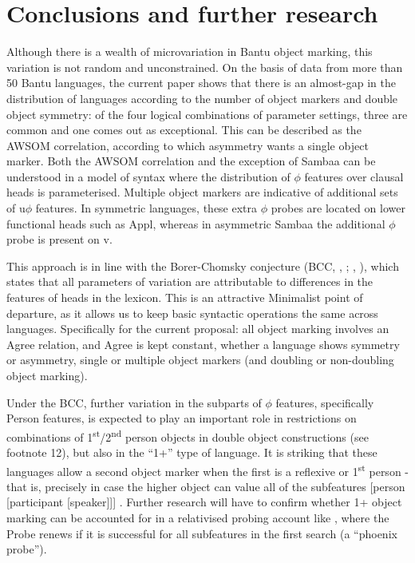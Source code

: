 \documentclass[output=paper
,modfonts
,nonflat]{langsci/langscibook}
\begin{document}
\section{Conclusions and further research}

Although there is a wealth of microvariation in Bantu object marking, this variation is not random and unconstrained. On the basis of data from more than 50 Bantu languages, the current paper shows that there is an almost-gap in the distribution of languages according to the number of object markers and double object symmetry: of the four logical combinations of parameter settings, three are common and one comes out as exceptional. This can be described as the AWSOM correlation, according to which asymmetry wants a single object marker. Both the AWSOM correlation and the exception of Sambaa can be understood in a model of syntax where the distribution of $\phi$ features over clausal heads is parameterised. Multiple object markers are indicative of additional sets of u$\phi$ features. In symmetric languages, these extra $\phi$ probes are located on lower functional heads such as Appl, whereas in asymmetric Sambaa the additional $\phi$ probe is present on v. 

This approach is in line with the Borer-Chomsky conjecture (BCC, \citealt{Baker2008a}, \citealt{Baker2008b}; \citealt{Borer1984}, \citealt{Chomsky1995}), which states that all parameters of variation are attributable to differences in the features of heads in the lexicon. This is an attractive Minimalist point of departure, as it allows us to keep basic syntactic operations the same across languages. Specifically for the current proposal: all object marking involves an Agree relation, and Agree is kept constant, whether a language shows symmetry or asymmetry, single or multiple object markers (and doubling or non-doubling object marking).

Under the BCC, further variation in the subparts of $\phi$ features, specifically Person features, is expected to play an important role in restrictions on combinations of 1\textsuperscript{st}/2\textsuperscript{nd} person objects in double object constructions (see footnote 12), but also in the “1+” type of language. It is striking that these languages allow a second object marker when the first is a reflexive or 1\textsuperscript{st} person - that is, precisely in case the higher object can value all of the subfeatures [person [participant [speaker]]] \citep{Bejar_Rezac2009}. Further research will have to confirm whether 1+ object marking can be accounted for in a relativised probing account like \citet{Bejar_Rezac2009}, where the Probe renews if it is successful for all subfeatures in the first search (a “phoenix probe”).
\end{document}
